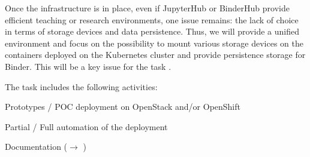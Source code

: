 \begin{task}[
  title=Easy deployment of JupyterHub and BinderHub on a variety of
  infrastructure,
  id=jh-bh-deployment,
  lead=EP,
  PM=11PM, %
  wphases={0-18}, %
  partners={EP,UPSUD}]
  Once the infrastructure is in place, even if JupyterHub or BinderHub provide
  efficient teaching or research environments, one issue remains: the lack of
  choice in terms of storage devices and data persistence. Thus, we will provide
  a unified environment and  focus on the possibility to mount various  storage
  devices on the containers deployed on the Kubernetes cluster and provide
  persistence storage for Binder. This will be a key issue for the task
  .
  
  The task includes the following activities:
  \begin{compactitem}
  \item Prototypes / POC deployment on OpenStack and/or OpenShift
  \item Partial / Full automation of the deployment
  \item Documentation ($\rightarrow$
  )
  \end{compactitem}
\end{task}
